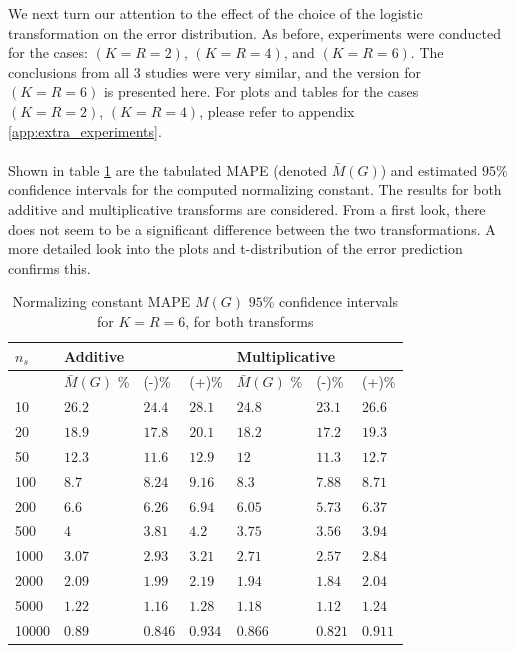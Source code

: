 We next turn our attention to the effect of the choice of the logistic transformation on the error distribution. As before, experiments were conducted for the cases: \((K=R=2)\), \((K=R=4)\), and \((K=R=6)\). The conclusions from all 3 studies were very similar, and the version for \((K=R=6)\) is presented here. For plots and tables for the cases \((K=R=2)\), \((K=R=4)\), please refer to appendix \ref{app:extra_experiments}.
\\\\
Shown in table \ref{tab:NC_MAPE_transforms} are the tabulated MAPE (denoted \(\bar{M}(G)\)) and estimated \(95\%\) confidence intervals for the computed normalizing constant. The results for both additive and multiplicative transforms are considered. From a first look, there does not seem to be a significant difference between the two transformations. A more detailed look into the plots and t-distribution of the error prediction confirms this. \\
\begin{table}[!htb]
\begin{center}
    \begin{tabular}{@{}lllllll@{}}
    \toprule
     \(n_s\) & \multicolumn{3}{l}{Additive} & \multicolumn{3}{l}{Multiplicative} \\ \midrule
        & \(\bar{M}(G)\) \% & (-)\% & (+)\% & \(\bar{M}(G)\) \% & (-)\% & (+)\%  \\ \midrule
        10 &\(26.2\) & \(24.4\) & \(28.1\) & \(24.8\) & \(23.1\) & \(26.6\)  \\ 
        20 &\(18.9\) & \(17.8\) & \(20.1\) & \(18.2\) & \(17.2\) & \(19.3\)  \\ 
        50 &\(12.3\) & \(11.6\) & \(12.9\) & \(12\) & \(11.3\) & \(12.7\)  \\ 
        100 &\(8.7\) & \(8.24\) & \(9.16\) & \(8.3\) & \(7.88\) & \(8.71\)  \\ 
        200 &\(6.6\) & \(6.26\) & \(6.94\) & \(6.05\) & \(5.73\) & \(6.37\)  \\ 
        500 &\(4\) & \(3.81\) & \(4.2\) & \(3.75\) & \(3.56\) & \(3.94\)  \\ 
        1000 &\(3.07\) & \(2.93\) & \(3.21\) & \(2.71\) & \(2.57\) & \(2.84\)  \\ 
        2000 &\(2.09\) & \(1.99\) & \(2.19\) & \(1.94\) & \(1.84\) & \(2.04\)  \\ 
        5000 &\(1.22\) & \(1.16\) & \(1.28\) & \(1.18\) & \(1.12\) & \(1.24\)  \\ 
        10000 &\(0.89\) & \(0.846\) & \(0.934\) & \(0.866\) & \(0.821\) & \(0.911\)  \\    \bottomrule
    \end{tabular}
\end{center}
\caption{Normalizing constant MAPE \(M(G)\) \(95 \%\) confidence intervals for \(K=R=6\), for both transforms}
\label{tab:NC_MAPE_transforms}
\end{table}

